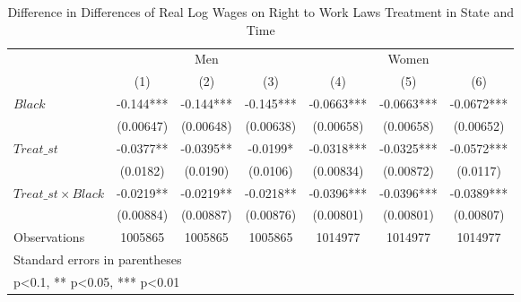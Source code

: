 \begin{table}[htbp]\centering
\def\sym#1{\ifmmode^{#1}\else\(^{#1}\)\fi}
\caption{Difference in Differences of Real Log Wages on Right to Work Laws Treatment in State and Time}
\begin{tabular}{l*{6}{c}}
\hline\hline
                    &\multicolumn{3}{c}{Men}                        &\multicolumn{3}{c}{Women}                      \\\cmidrule(lr){2-4}\cmidrule(lr){5-7}
                    &\multicolumn{1}{c}{(1)}   &\multicolumn{1}{c}{(2)}   &\multicolumn{1}{c}{(3)}   &\multicolumn{1}{c}{(4)}   &\multicolumn{1}{c}{(5)}   &\multicolumn{1}{c}{(6)}   \\
\hline
$ Black $           &      -0.144***&      -0.144***&      -0.145***&     -0.0663***&     -0.0663***&     -0.0672***\\
                    &   (0.00647)   &   (0.00648)   &   (0.00638)   &   (0.00658)   &   (0.00658)   &   (0.00652)   \\
[1em]
$ Treat\_{st} $      &     -0.0377** &     -0.0395** &     -0.0199*  &     -0.0318***&     -0.0325***&     -0.0572***\\
                    &    (0.0182)   &    (0.0190)   &    (0.0106)   &   (0.00834)   &   (0.00872)   &    (0.0117)   \\
[1em]
$ Treat\_{st} \times Black $&     -0.0219** &     -0.0219** &     -0.0218** &     -0.0396***&     -0.0396***&     -0.0389***\\
                    &   (0.00884)   &   (0.00887)   &   (0.00876)   &   (0.00801)   &   (0.00801)   &   (0.00807)   \\
\hline
Observations        &     1005865   &     1005865   &     1005865   &     1014977   &     1014977   &     1014977   \\
\hline\hline
\multicolumn{7}{l}{\footnotesize Standard errors in parentheses}\\
\multicolumn{7}{l}{\footnotesize * p<0.1, ** p<0.05, *** p<0.01}\\
\end{tabular}
\end{table}
